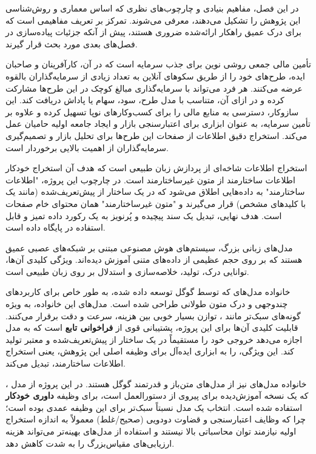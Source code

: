 

در این فصل، مفاهیم بنیادی و چارچوب‌های نظری که اساس معماری و روش‌شناسی این پژوهش را تشکیل می‌دهند، معرفی می‌شوند. تمرکز بر تعریف مفاهیمی است که برای درک عمیق راهکار ارائه‌شده ضروری هستند، پیش از آنکه جزئیات پیاده‌سازی در فصل‌های بعدی مورد بحث قرار گیرند.

تأمین مالی جمعی روشی نوین برای جذب سرمایه است که در آن، کارآفرینان و صاحبان ایده، طرح‌های خود را از طریق سکوهای آنلاین به تعداد زیادی از سرمایه‌گذاران بالقوه عرضه می‌کنند. هر فرد می‌تواند با سرمایه‌گذاری مبالغ کوچک در این طرح‌ها مشارکت کرده و در ازای آن، متناسب با مدل طرح، سود، سهام یا پاداش دریافت کند. این سازوکار، دسترسی به منابع مالی را برای کسب‌وکارهای نوپا تسهیل کرده و علاوه بر تأمین سرمایه، به عنوان ابزاری برای اعتبارسنجی بازار و ایجاد جامعه اولیه حامیان عمل می‌کند. استخراج دقیق اطلاعات از صفحات این طرح‌ها برای تحلیل بازار و تصمیم‌گیری سرمایه‌گذاران از اهمیت بالایی برخوردار است.


استخراج اطلاعات شاخه‌ای از پردازش زبان طبیعی است که هدف آن استخراج خودکار اطلاعات ساختارمند از متون غیرساختارمند است. در چارچوب این پروژه، "اطلاعات ساختارمند" به داده‌هایی اطلاق می‌شود که در یک ساختار از پیش‌تعریف‌شده (مانند یک  با کلیدهای مشخص) قرار می‌گیرند و "متون غیرساختارمند" همان محتوای خام صفحات  است. هدف نهایی، تبدیل یک سند  پیچیده و پُرنویز به یک رکورد داده تمیز و قابل استفاده در پایگاه داده است.


مدل‌های زبانی بزرگ، سیستم‌های هوش مصنوعی مبتنی بر شبکه‌های عصبی عمیق هستند که بر روی حجم عظیمی از داده‌های متنی آموزش دیده‌اند. ویژگی کلیدی آن‌ها، توانایی درک، تولید، خلاصه‌سازی و استدلال بر روی زبان طبیعی است.

خانواده مدل‌های  که توسط گوگل توسعه داده شده، به طور خاص برای کاربردهای چندوجهی و درک متون طولانی طراحی شده است. مدل‌های این خانواده، به ویژه گونه‌های سبک‌تر مانند ، توازن بسیار خوبی بین هزینه، سرعت و دقت برقرار می‌کنند. قابلیت کلیدی آن‌ها برای این پروژه، پشتیبانی قوی از \textbf{فراخوانی تابع} است که به مدل اجازه می‌دهد خروجی خود را مستقیماً در یک ساختار از پیش‌تعریف‌شده و معتبر تولید کند. این ویژگی،  را به ابزاری ایده‌آل برای وظیفه اصلی این پژوهش، یعنی استخراج اطلاعات ساختارمند، تبدیل می‌کند.

خانواده مدل‌های  نیز از مدل‌های متن‌باز و قدرتمند گوگل هستند. در این پروژه از مدل ، که یک نسخه آموزش‌دیده برای پیروی از دستورالعمل است، برای وظیفه \textbf{داوری خودکار} استفاده شده است. انتخاب یک مدل نسبتاً سبک‌تر برای این وظیفه عمدی بوده است؛ چرا که وظایف اعتبارسنجی و قضاوت دودویی (صحیح/غلط) معمولاً به اندازه استخراج اولیه نیازمند توان محاسباتی بالا نیستند و استفاده از مدل‌های بهینه‌تر می‌تواند هزینه ارزیابی‌های مقیاس‌بزرگ را به شدت کاهش دهد.

